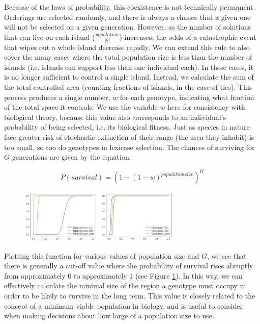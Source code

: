 Because of the laws of probability, this coexistence is not technically permanent. Orderings are selected randomly, and there is always a chance that a given one will not be selected on a given generation. However, as the number of solutions that can live on each island ($\frac{population}{N!}$) increases, the odds of a catastrophic event that wipes out a whole island decrease rapidly. We can extend this rule to also cover the many cases where the total population size is less than the number of islands (i.e. islands can support less than one individual each). In these cases, it is no longer sufficient to control a single island. Instead, we calculate the sum of the total controlled area (counting fractions of islands, in the case of ties). This process produces a single number, $w$ for each genotype, indicating what fraction of the total space it controls. We use the variable $w$ here for consistency with biological theory, because this value also corresponds to an individual's probability of being selected, i.e. its biological fitness. Just as species in nature face greater risk of stochastic extinction of their range (the area they inhabit) is too small, so too do genotypes in lexicase selection. The chances of surviving for $G$ generations are given by the equation:

\begin{equation}
P(survival) = (1 - (1-w)^{population size})^{G}
\end{equation}
\begin{figure}
\includegraphics[width=1.5in]{figs/survival_pop_size.png}
\includegraphics[width=1.5in]{figs/survival_generations.png}
\caption{}
\label{prob_survival}
\end{figure}

Plotting this function for various values of population size and $G$, we see that there is generally a cut-off value where the probability of survival rises abruptly from approximately 0 to approximately 1 (see Figure \ref{prob_survival}). In this way, we can effectively calculate the minimal size of the region a genotype must occupy in order to be likely to survive in the long term. This value is closely related to the concept of a minimum viable population in biology, and is useful to consider when making decisions about how large of a population size to use. 

